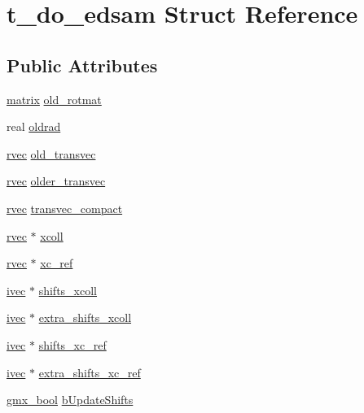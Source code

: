 \hypertarget{structt__do__edsam}{\section{t\-\_\-do\-\_\-edsam \-Struct \-Reference}
\label{structt__do__edsam}
}
\subsection*{\-Public \-Attributes}
\begin{DoxyCompactItemize}
\item 
\hyperlink{share_2template_2gromacs_2types_2simple_8h_a7ea9c2a830d3f743b887387e33645a83}{matrix} \hyperlink{structt__do__edsam_a56650d068b3baa47a1ed74c242a015cc}{old\-\_\-rotmat}
\item 
real \hyperlink{structt__do__edsam_abbbf25eaa302f98bdf4e3487cd6708f5}{oldrad}
\item 
\hyperlink{share_2template_2gromacs_2types_2simple_8h_aa02a552a4abd2f180c282a083dc3a999}{rvec} \hyperlink{structt__do__edsam_a02e681b777d443fe3f39db9520f84970}{old\-\_\-transvec}
\item 
\hyperlink{share_2template_2gromacs_2types_2simple_8h_aa02a552a4abd2f180c282a083dc3a999}{rvec} \hyperlink{structt__do__edsam_a42d22751ba11fc39cee0735d42b112ec}{older\-\_\-transvec}
\item 
\hyperlink{share_2template_2gromacs_2types_2simple_8h_aa02a552a4abd2f180c282a083dc3a999}{rvec} \hyperlink{structt__do__edsam_a73692e5311bbac0f5b73df69543d2e58}{transvec\-\_\-compact}
\item 
\hyperlink{share_2template_2gromacs_2types_2simple_8h_aa02a552a4abd2f180c282a083dc3a999}{rvec} $\ast$ \hyperlink{structt__do__edsam_aed23639ff7646d73032b14bf2166b660}{xcoll}
\item 
\hyperlink{share_2template_2gromacs_2types_2simple_8h_aa02a552a4abd2f180c282a083dc3a999}{rvec} $\ast$ \hyperlink{structt__do__edsam_a3ad6ddaf291b3fc78be729dc4a52a29f}{xc\-\_\-ref}
\item 
\hyperlink{share_2template_2gromacs_2types_2simple_8h_a74f6ffdb4a9c1764f5293969d8c681b6}{ivec} $\ast$ \hyperlink{structt__do__edsam_a57095ba09c64b948576dae748f30e3ba}{shifts\-\_\-xcoll}
\item 
\hyperlink{share_2template_2gromacs_2types_2simple_8h_a74f6ffdb4a9c1764f5293969d8c681b6}{ivec} $\ast$ \hyperlink{structt__do__edsam_abd1a3a38e21f97f0b9e081a09c747ef5}{extra\-\_\-shifts\-\_\-xcoll}
\item 
\hyperlink{share_2template_2gromacs_2types_2simple_8h_a74f6ffdb4a9c1764f5293969d8c681b6}{ivec} $\ast$ \hyperlink{structt__do__edsam_a21cf090fcd934ab5b98473d405e25727}{shifts\-\_\-xc\-\_\-ref}
\item 
\hyperlink{share_2template_2gromacs_2types_2simple_8h_a74f6ffdb4a9c1764f5293969d8c681b6}{ivec} $\ast$ \hyperlink{structt__do__edsam_a60a9cca205791f46408191cd49afa30b}{extra\-\_\-shifts\-\_\-xc\-\_\-ref}
\item 
\hyperlink{include_2types_2simple_8h_a8fddad319f226e856400d190198d5151}{gmx\-\_\-bool} \hyperlink{structt__do__edsam_a70f5514a3eff88b1680a1c58b0b46c6d}{b\-Update\-Shifts}
\end{DoxyCompactItemize}


